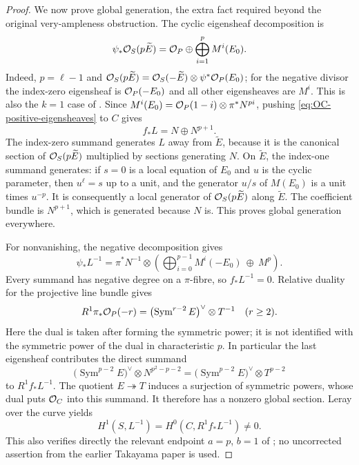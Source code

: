 \begin{proof}
We now prove global generation, the extra fact required beyond the original very-ampleness obstruction.  The cyclic eigensheaf decomposition is
\begin{equation}\label{eq:OC-positive-eigensheaves}
 \psi_*\mathcal O_S(p\widetilde E)
       =\mathcal O_P\oplus\bigoplus_{i=1}^p M^i(E_0).
\end{equation}
Indeed, $p=\ell-1$ and
$\mathcal O_S(p\widetilde E)=\mathcal O_S(-\widetilde E)\otimes\psi^*\mathcal O_P(E_0)$;
for the negative divisor the index-zero eigensheaf is $\mathcal O_P(-E_0)$ and all other eigensheaves are $M^i$.  This is also the $k=1$ case of
\cite[Proposition~3.3]{Zheng2017Kodaira}.  Since
$M^i(E_0)=\mathcal O_P(1-i)\otimes\pi^*N^{pi}$, pushing \eqref{eq:OC-positive-eigensheaves} to $C$ gives
\[
                       f_*L=N\oplus N^{p+1}.
\]
The index-zero summand generates $L$ away from $\widetilde E$, because it is the canonical section of $\mathcal O_S(p\widetilde E)$ multiplied by sections generating $N$.  On $\widetilde E$, the index-one summand generates: if $s=0$ is a local equation of $E_0$ and $u$ is the cyclic parameter, then $u^\ell=s$ up to a unit, and the generator $u/s$ of $M(E_0)$ is a unit times $u^{-p}$.  It is consequently a local generator of $\mathcal O_S(p\widetilde E)$ along $\widetilde E$.  The coefficient bundle is $N^{p+1}$, which is generated because $N$ is.  This proves global generation everywhere.

For nonvanishing, the negative decomposition gives
\[
 \psi_*L^{-1}
   =\pi^*N^{-1}\otimes
      \left(\bigoplus_{i=0}^{p-1}M^i(-E_0)\ \oplus\ M^p\right).
\]
Every summand has negative degree on a $\pi$-fibre, so $f_*L^{-1}=0$.  Relative duality for the projective line bundle gives
\[
 R^1\pi_*\mathcal O_P(-r)=\bigl(\operatorname{Sym}^{r-2}E\bigr)^\vee\otimes T^{-1}
       \quad(r\geq2).
\]
Here the dual is taken after forming the symmetric power; it is not identified with the symmetric power of the dual in characteristic $p$.  In particular the last eigensheaf contributes the direct summand
\[
 \bigl(\operatorname{Sym}^{p-2}E\bigr)^\vee
          \otimes N^{p^2-p-2}
    =\bigl(\operatorname{Sym}^{p-2}E\bigr)^\vee\otimes T^{p-2}
\]
to $R^1f_*L^{-1}$.  The quotient $E\twoheadrightarrow T$ induces a surjection of symmetric powers, whose dual puts $\mathcal O_C$ into this summand.  It therefore has a nonzero global section.  Leray over the curve yields
\[
        H^1(S,L^{-1})=H^0(C,R^1f_*L^{-1})\ne0.
\]
This also verifies directly the relevant endpoint $a=p$, $b=1$ of
\cite[Theorem~3.7]{Zheng2017Kodaira}; no uncorrected assertion from the earlier Takayama paper is used.


\end{proof}
